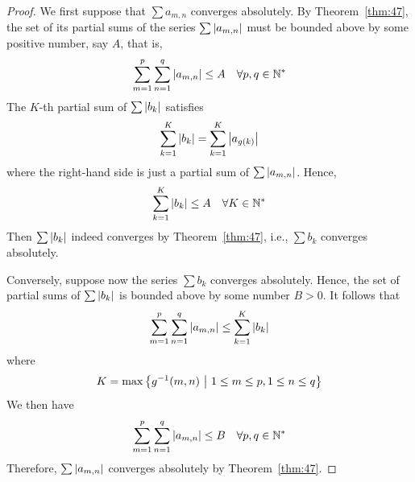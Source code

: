 \documentclass[thmcnt=section, 12pt]{my-elegantbook}
\begin{document}
\begin{proof}
    We first suppose that $\sum a_{m,n}$ converges absolutely. By Theorem~\ref{thm:47}, the set of its partial sums of the series $\sum \left\lvert a_{m,n} \right\rvert$ must be bounded above by some positive number, say $A$, that is,
    \begin{align*}
        \sum_{m=1}^p \sum_{n=1}^q \left\lvert a_{m,n} \right\rvert \leq A
        \quad \forall p,q \in \mathbb{N}^\ast
    \end{align*}
    The $K$-th partial sum of $\sum \left\lvert b_k \right\rvert$ satisfies
    \begin{align*}
        \sum_{k=1}^K \left\lvert b_k \right\rvert
        = \sum_{k=1}^K \left\lvert a_{g(k)} \right\rvert
    \end{align*}
    where the right-hand side is just a partial sum of $\sum \left\lvert a_{m,n} \right\rvert$. Hence,
    \begin{align*}
        \sum_{k=1}^K \left\lvert b_k \right\rvert
        \leq A
        \quad
        \forall K \in \mathbb{N}^\ast
    \end{align*}
    Then $\sum \left\lvert b_k \right\rvert$ indeed converges by Theorem~\ref{thm:47}, i.e., $\sum b_k$ converges absolutely.

    Conversely, suppose now the series $\sum b_k$ converges absolutely. Hence, the set of partial sums of $\sum \left\lvert b_k \right\rvert$ is bounded above by some number $B > 0$. It follows that
    \begin{align*}
        \sum_{m=1}^p \sum_{n=1}^q \left\lvert a_{m,n} \right\rvert
        \leq \sum_{k=1}^K \left\lvert b_k \right\rvert
    \end{align*}
    where
    \begin{align*}
        K = \max \left\{  g^{-1}(m,n)  \ \middle| \ 1 \leq m \leq p, 1 \leq n \leq q \right\}
    \end{align*}
    We then have
    \begin{align*}
        \sum_{m=1}^p \sum_{n=1}^q \left\lvert a_{m,n} \right\rvert
        \leq B
        \quad
        \forall p,q \in \mathbb{N}^\ast
    \end{align*}
    Therefore, $\sum \left\lvert a_{m,n} \right\rvert$ converges absolutely by Theorem~\ref{thm:47}.
\end{proof}
\end{document}
